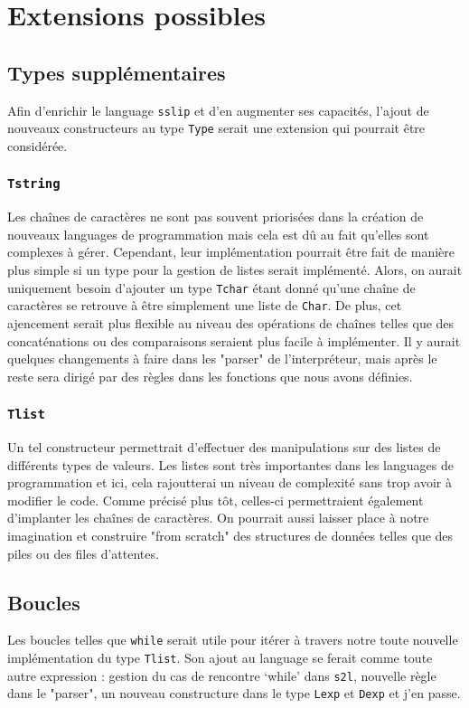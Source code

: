 \documentclass[a4paper,12pt]{article}
\begin{document}
\newpage
\section{Extensions possibles}
    \subsection{Types supplémentaires}
        Afin d'enrichir le language \texttt{sslip} et d'en augmenter ses capacités, l'ajout de 
        nouveaux constructeurs au type \texttt{Type} serait une extension qui pourrait être 
        considérée.
        \subsubsection{\texttt{Tstring}}
            Les chaînes de caractères ne sont pas souvent priorisées dans la création de nouveaux
            languages de programmation mais cela est dû au fait qu'elles sont complexes à gérer.
            Cependant, leur implémentation pourrait être fait de manière plus simple si un type
            pour la gestion de listes serait implémenté. Alors, on aurait uniquement besoin 
            d'ajouter un type \texttt{Tchar} étant donné qu'une chaîne de caractères se retrouve
            à être simplement une liste de \texttt{Char}. De plus, cet ajencement serait plus
            flexible au niveau des opérations de chaînes telles que des concaténations ou des 
            comparaisons seraient plus facile à implémenter. Il y aurait quelques changements 
            à faire dans les "parser" de l'interpréteur, mais après le reste sera dirigé par 
            des règles dans les fonctions que nous avons définies.
        \subsubsection{\texttt{Tlist}}
            Un tel constructeur permettrait d'effectuer des manipulations sur des listes
            de différents types de valeurs. Les listes sont très importantes dans les 
            languages de programmation et ici, cela rajoutterai un niveau de complexité 
            sans trop avoir à modifier le code. Comme précisé plus tôt, celles-ci permettraient
            également d'implanter les chaînes de caractères. On pourrait aussi laisser
            place à notre imagination et construire "from scratch" des structures de données
            telles que des piles ou des files d'attentes.
    \subsection{Boucles}
        Les boucles telles que \texttt{while} serait utile pour itérer à travers notre toute 
        nouvelle implémentation du type \texttt{Tlist}. Son ajout au language se ferait comme 
        toute autre expression : gestion du cas de rencontre `while' dans \texttt{s2l}, nouvelle
        règle dans le "parser", un nouveau constructure dans le type \texttt{Lexp} et \texttt{Dexp}
        et j'en passe.
\end{document}
